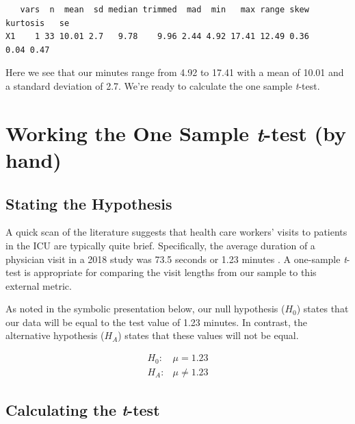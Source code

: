 \documentclass[
  11pt,
]{book}
\newenvironment{Shaded}{\begin{snugshade}}{\end{snugshade}}
\newcommand{\FunctionTok}[1]{\textcolor[rgb]{0.27,0.27,0.27}{\textbf{#1}}}
\newcommand{\NormalTok}[1]{#1}
\newcommand{\SpecialCharTok}[1]{\textcolor[rgb]{0.43,0.43,0.43}{\textbf{#1}}}
\begin{document}
\begin{Shaded}
\end{Shaded}

\begin{verbatim}
   vars  n  mean  sd median trimmed  mad  min   max range skew kurtosis   se
X1    1 33 10.01 2.7   9.78    9.96 2.44 4.92 17.41 12.49 0.36     0.04 0.47
\end{verbatim}

Here we see that our minutes range from 4.92 to 17.41 with a mean of 10.01 and a standard deviation of 2.7. We're ready to calculate the one sample \emph{t}-test.

\hypertarget{working-the-one-sample-t-test-by-hand}{%
\section{\texorpdfstring{Working the One Sample \emph{t}-test (by hand)}{Working the One Sample t-test (by hand)}}\label{working-the-one-sample-t-test-by-hand}}

\hypertarget{stating-the-hypothesis}{%
\subsection{Stating the Hypothesis}\label{stating-the-hypothesis}}

A quick scan of the literature suggests that health care workers' visits to patients in the ICU are typically quite brief. Specifically, the average duration of a physician visit in a 2018 study was 73.5 seconds or 1.23 minutes \citep{butler_estimating_2018}. A one-sample \emph{t}-test is appropriate for comparing the visit lengths from our sample to this external metric.

As noted in the symbolic presentation below, our null hypothesis (\(H_0\)) states that our data will be equal to the test value of 1.23 minutes. In contrast, the alternative hypothesis (\(H_A\)) states that these values will not be equal.

\[
\begin{array}{ll}
H_0: & \mu = 1.23 \\
H_A: & \mu \neq 1.23
\end{array}
\]

\hypertarget{calculating-the-t-test}{%
\subsection{\texorpdfstring{Calculating the \emph{t}-test}{Calculating the t-test}}\label{calculating-the-t-test}}
\end{document}
